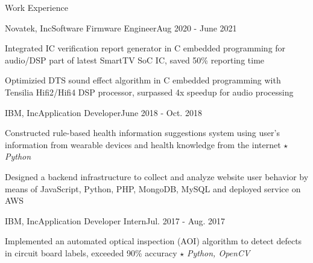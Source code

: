 \documentclass{resume_short} %
\begin{document}
\begin{rSection}{Work Experience}
    \begin{rSubsection3}{Novatek, Inc}{Software Firmware Engineer}{Aug 2020 - June 2021}
        \item Integrated IC verification report generator in C embedded programming for audio/DSP part of latest SmartTV SoC IC, saved 50\% reporting time
        \item Optimizied DTS sound effect algorithm in C embedded programming with Tensilia Hifi2/Hifi4 DSP processor, surpassed 4x speedup for audio processing
    \end{rSubsection3}
    \begin{rSubsection3}{IBM, Inc}{Application Developer}{June 2018 - Oct. 2018}
        \item Constructed rule-based health information suggestions system using user's information from wearable devices and health knowledge from the internet $\star$ {\em Python}
        \item Designed a backend infrastructure to collect and analyze website user behavior by means of JavaScript, Python, PHP, MongoDB, MySQL and deployed service on AWS
    \end{rSubsection3}
    \begin{rSubsection3}{IBM, Inc}{Application Developer Intern}{Jul. 2017 - Aug. 2017}
        \item Implemented an automated optical inspection (AOI) algorithm to 
              detect defects in circuit board labels, exceeded 90\% accuracy $\star$ {\em Python, OpenCV}
    \end{rSubsection3}
\end{rSection}
\end{document}
